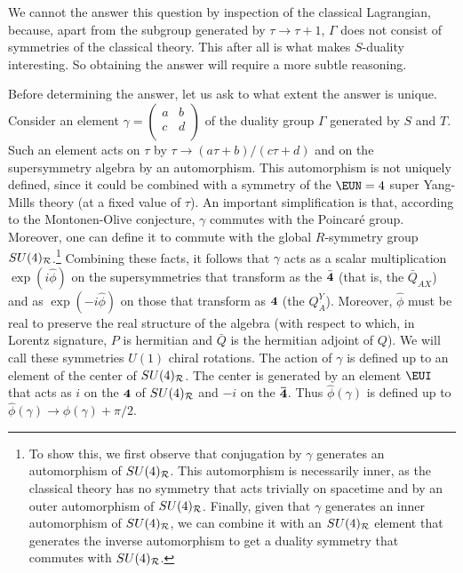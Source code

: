  We cannot the answer this question by inspection
of the classical Lagrangian, because, apart from the subgroup
generated by $\tau\to \tau+1$, $\Gamma$ does not consist of
symmetries of the classical theory. This after all is what makes
$S$-duality interesting.  So obtaining the answer will require a
more subtle reasoning.

Before determining the answer, let us ask to what extent the
answer is unique.  Consider an element $\gamma=\left(\begin{matrix}a & b
\\ c & d \\\end{matrix}\right)$ of the duality group $\Gamma$ generated by
$S$ and $T$. Such an element acts on $\tau$ by $\tau\to
(a\tau+b)/(c\tau+d)$ and on the supersymmetry algebra by an
automorphism. This automorphism is not uniquely defined, since it
could be combined with a symmetry of the ${\EUN}=4$ super
Yang-Mills theory (at a fixed value of $\tau$). An important
simplification is that, according to the Montonen-Olive
conjecture, $\gamma$ commutes with the Poincar\'e group. Moreover,
one can define it to commute with  the global $R$-symmetry group
$SU(4)_{{\cal R}}$.\footnote{To show this, we first observe that
conjugation by $\gamma$ generates an automorphism of $SU(4)_{{\cal
R}}$.  This automorphism is necessarily inner, as the classical
theory has no symmetry that acts trivially on spacetime and by an
outer automorphism of $SU(4)_{{\cal R}}$. Finally, given that
$\gamma$ generates an inner automorphism of $SU(4)_{{\cal R}}$, we
can combine it with an $SU(4)_{{\cal R}}$ element that generates
the inverse automorphism to get a duality symmetry that commutes
with $SU(4)_{{\cal R}}$. } Combining these facts, it follows that
$\gamma$ acts as a scalar multiplication $\exp(i\hat\phi)$ on the
supersymmetries that transform as the $\bar{\bf 4}$ (that is, the
$\bar Q_{AX}$) and as $\exp(-i\hat\phi)$ on those that transform
as ${\bf 4}$ (the $ Q_{\dot A}^Y$). Moreover, $\hat\phi$ must be
real to preserve the real structure of the algebra (with respect
to which, in Lorentz signature, $P$ is hermitian and $\bar Q$ is
the hermitian adjoint of $Q$).  We will call these symmetries
$U(1)$ chiral rotations. The action of $\gamma$ is defined up to
an element of the center of $SU(4)_{{\cal R}}$. The center is
generated by an element ${\EUI}$ that acts as $i$ on the ${\bf 4}$
of $SU(4)_{{\cal R}}$ and $-i$ on the $\bf{ \bar 4}$. Thus
$\hat\phi(\gamma)$ is defined up to
$\hat\phi(\gamma)\to\hat\phi(\gamma)+\pi/2$.

